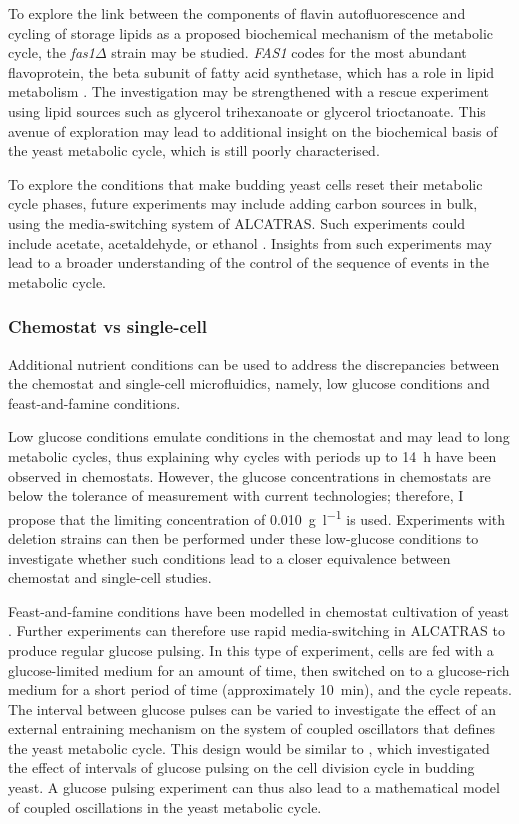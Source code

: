 To explore the link between the components of flavin autofluorescence and cycling of storage lipids as a proposed biochemical mechanism of the metabolic cycle, the \textit{fas1$\Delta$} strain may be studied.
\textit{FAS1} codes for the most abundant flavoprotein, the beta subunit of fatty acid synthetase, which has a role in lipid metabolism \parencite{gudipatiFlavoproteomeYeastSaccharomyces2014}.
The investigation may be strengthened with a rescue experiment using lipid sources such as glycerol trihexanoate or glycerol trioctanoate.
This avenue of exploration may lead to additional insight on the biochemical basis of the yeast metabolic cycle, which is still poorly characterised.

To explore the conditions that make budding yeast cells reset their metabolic cycle phases, future experiments may include adding carbon sources in bulk, using the media-switching system of ALCATRAS\@.
Such experiments could include acetate, acetaldehyde, or ethanol \parencite{kuangMsn2RegulateExpression2017, krishnaMinimalPushPull2018}.
Insights from such experiments may lead to a broader understanding of the control of the sequence of events in the metabolic cycle.


\subsubsection{Chemostat vs single-cell}
\label{subsec:biology-discussion-caveats-chemostat}

Additional nutrient conditions can be used to address the discrepancies between the chemostat and single-cell microfluidics, namely, low glucose conditions and feast-and-famine conditions.

Low glucose conditions emulate conditions in the chemostat and may lead to long metabolic cycles, thus explaining why cycles with periods up to \SI{14}{\hour} have been observed in chemostats.
However, the glucose concentrations in chemostats are below the tolerance of measurement with current technologies; therefore, I propose that the limiting concentration of \SI{0.010}{\gram~\litre^{-1}} is used.
Experiments with deletion strains can then be performed under these low-glucose conditions to investigate whether such conditions lead to a closer equivalence between chemostat and single-cell studies.

Feast-and-famine conditions have been modelled in chemostat cultivation of yeast \parencite{jonesCyberneticModelGrowth1999}.
Further experiments can therefore use rapid media-switching in ALCATRAS to produce regular glucose pulsing.
In this type of experiment, cells are fed with a glucose-limited medium for an amount of time, then switched on to a glucose-rich medium for a short period of time (approximately \SI{10}{\minute}), and the cycle repeats.
The interval between glucose pulses can be varied to investigate the effect of an external entraining mechanism on the system of coupled oscillators that defines the yeast metabolic cycle.
This design would be similar to \textcite{charvinForcedPeriodicExpression2009}, which investigated the effect of intervals of glucose pulsing on the cell division cycle in budding yeast.
A glucose pulsing experiment can thus also lead to a mathematical model of coupled oscillations in the yeast metabolic cycle.
